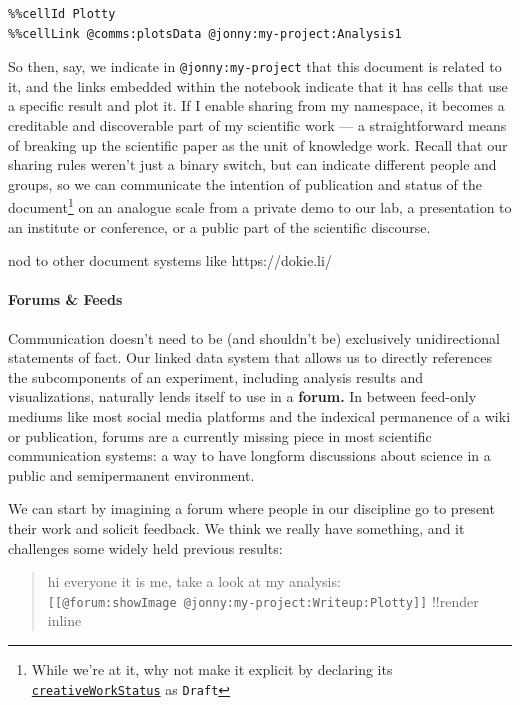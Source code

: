 \documentclass[10pt]{article}
\begin{document}
\begin{multicols}{2}
\begin{verbatim}
%%cellId Plotty
%%cellLink @comms:plotsData @jonny:my-project:Analysis1
\end{verbatim}

So then, say, we indicate in \texttt{@jonny:my-project} that this
document is related to it, and the links embedded within the notebook
indicate that it has cells that use a specific result and plot it. If I
enable sharing from my namespace, it becomes a creditable and
discoverable part of my scientific work --- a straightforward means of
breaking up the scientific paper as the unit of knowledge work. Recall
that our sharing rules weren't just a binary switch, but can indicate
different people and groups, so we can communicate the intention of
publication and status of the document\footnote{While we're at it, why
  not make it explicit by declaring its
  \href{https://schema.org/creativeWorkStatus}{\texttt{creativeWorkStatus}}
  as \texttt{Draft}} on an analogue scale from a private demo to our
lab, a presentation to an institute or conference, or a public part of
the scientific discourse.

nod to other document systems like https://dokie.li/

\hypertarget{forums-feeds}{%
\paragraph{Forums \& Feeds}\label{forums-feeds}}

Communication doesn't need to be (and shouldn't be) exclusively
unidirectional statements of fact. Our linked data system that allows us
to directly references the subcomponents of an experiment, including
analysis results and visualizations, naturally lends itself to use in a
\textbf{forum.} In between feed-only mediums like most social media
platforms and the indexical permanence of a wiki or publication, forums
are a currently missing piece in most scientific communication systems:
a way to have longform discussions about science in a public and
semipermanent environment.

We can start by imagining a forum where people in our discipline go to
present their work and solicit feedback. We think we really have
something, and it challenges some widely held previous results:

\begin{quote}
hi everyone it is me, take a look at my analysis:
\texttt{{[}{[}@forum:showImage\ @jonny:my-project:Writeup:Plotty{]}{]}}
!!render inline


\end{quote}
\end{multicols}
\end{document}
